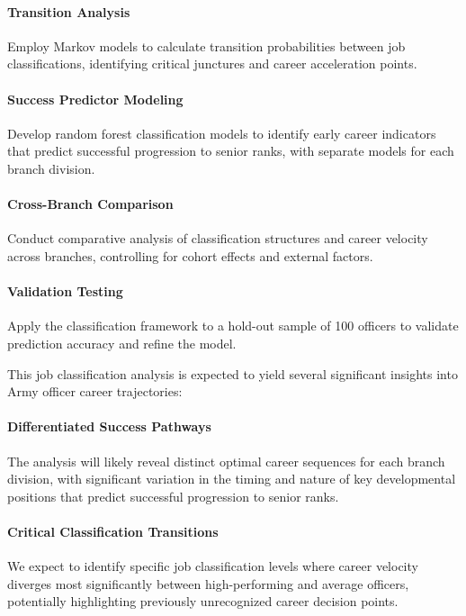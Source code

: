 \documentclass[../main.tex]{subfiles}
\begin{document}
\paragraph{Transition Analysis} Employ Markov models to calculate transition probabilities between job classifications, identifying critical junctures and career acceleration points.

\paragraph{Success Predictor Modeling} Develop random forest classification models to identify early career indicators that predict successful progression to senior ranks, with separate models for each branch division.

\paragraph{Cross-Branch Comparison} Conduct comparative analysis of classification structures and career velocity across branches, controlling for cohort effects and external factors.

\paragraph{Validation Testing} Apply the classification framework to a hold-out sample of 100 officers to validate prediction accuracy and refine the model.

This job classification analysis is expected to yield several significant insights into Army officer career trajectories:

\paragraph{Differentiated Success Pathways} The analysis will likely reveal distinct optimal career sequences for each branch division, with significant variation in the timing and nature of key developmental positions that predict successful progression to senior ranks.

\paragraph{Critical Classification Transitions} We expect to identify specific job classification levels where career velocity diverges most significantly between high-performing and average officers, potentially highlighting previously unrecognized career decision points.
\end{document}
